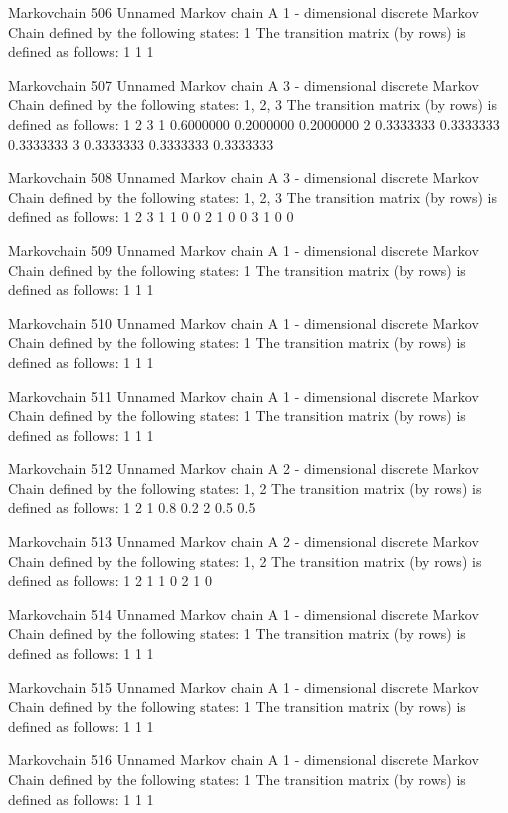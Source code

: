 \documentclass[
  nojss]{jss}
\begin{document}
\begin{CodeChunk}
\begin{CodeOutput}
Markovchain  506 
Unnamed Markov chain 
 A  1 - dimensional discrete Markov Chain defined by the following states: 
 1 
 The transition matrix  (by rows)  is defined as follows: 
  1
1 1

Markovchain  507 
Unnamed Markov chain 
 A  3 - dimensional discrete Markov Chain defined by the following states: 
 1, 2, 3 
 The transition matrix  (by rows)  is defined as follows: 
          1         2         3
1 0.6000000 0.2000000 0.2000000
2 0.3333333 0.3333333 0.3333333
3 0.3333333 0.3333333 0.3333333

Markovchain  508 
Unnamed Markov chain 
 A  3 - dimensional discrete Markov Chain defined by the following states: 
 1, 2, 3 
 The transition matrix  (by rows)  is defined as follows: 
  1 2 3
1 1 0 0
2 1 0 0
3 1 0 0

Markovchain  509 
Unnamed Markov chain 
 A  1 - dimensional discrete Markov Chain defined by the following states: 
 1 
 The transition matrix  (by rows)  is defined as follows: 
  1
1 1

Markovchain  510 
Unnamed Markov chain 
 A  1 - dimensional discrete Markov Chain defined by the following states: 
 1 
 The transition matrix  (by rows)  is defined as follows: 
  1
1 1

Markovchain  511 
Unnamed Markov chain 
 A  1 - dimensional discrete Markov Chain defined by the following states: 
 1 
 The transition matrix  (by rows)  is defined as follows: 
  1
1 1

Markovchain  512 
Unnamed Markov chain 
 A  2 - dimensional discrete Markov Chain defined by the following states: 
 1, 2 
 The transition matrix  (by rows)  is defined as follows: 
    1   2
1 0.8 0.2
2 0.5 0.5

Markovchain  513 
Unnamed Markov chain 
 A  2 - dimensional discrete Markov Chain defined by the following states: 
 1, 2 
 The transition matrix  (by rows)  is defined as follows: 
  1 2
1 1 0
2 1 0

Markovchain  514 
Unnamed Markov chain 
 A  1 - dimensional discrete Markov Chain defined by the following states: 
 1 
 The transition matrix  (by rows)  is defined as follows: 
  1
1 1

Markovchain  515 
Unnamed Markov chain 
 A  1 - dimensional discrete Markov Chain defined by the following states: 
 1 
 The transition matrix  (by rows)  is defined as follows: 
  1
1 1

Markovchain  516 
Unnamed Markov chain 
 A  1 - dimensional discrete Markov Chain defined by the following states: 
 1 
 The transition matrix  (by rows)  is defined as follows: 
  1
1 1


\end{CodeOutput}
\end{CodeChunk}
\end{document}
